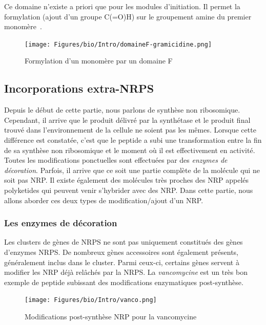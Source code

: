 Ce domaine n'existe a priori que pour les modules d'initiation.
Il permet la formylation (ajout d'un groupe C(=O)H) sur le groupement amine du premier monomère~\cite{schonafinger_amide_2007}.

\begin{figure}[h!]
  \begin{center}
    \texttt{[image: Figures/bio/Intro/domaineF-gramicidine.png]}
    \caption{\label{domaine_F}Formylation d'un monomère par un domaine F}
  \end{center}
\end{figure}


\subsection{Incorporations extra-NRPS}

Depuis le début de cette partie, nous parlons de synthèse non ribosomique.
Cependant, il arrive que le produit délivré par la synthétase et le produit final trouvé dans l'environnement de la cellule ne soient pas les mêmes.
Lorsque cette différence est constatée, c'est que le peptide a subi une transformation entre la fin de sa synthèse non ribosomique et le moment où il est effectivement en activité.
Toutes les modifications ponctuelles sont effectuées par des \textit{enzymes de décoration}.
Parfois, il arrive que ce soit une partie complète de la molécule qui ne soit pas NRP.
Il existe également des molécules très proches des NRP appelés polyketides qui peuvent venir s'hybrider avec des NRP.
Dans cette partie, nous allons aborder ces deux types de modification/ajout d'un NRP.


\subsubsection{Les enzymes de décoration}

\label{sucres}

Les clusters de gènes de NRPS ne sont pas uniquement constitués des gènes d'enzymes NRPS.
De nombreux gènes accessoires sont également présents, généralement inclus dans le cluster.
Parmi ceux-ci, certains gènes servent à modifier les NRP déjà relâchés par la NRPS.
La \textit{vancomycine} est un très bon exemple de peptide subissant des modifications enzymatiques post-synthèse.

\begin{figure}[h!]
  \begin{center}
    \texttt{[image: Figures/bio/Intro/vanco.png]}
    \caption{\label{vanco}Modifications post-synthèse NRP pour la vancomycine}
  \end{center}
\end{figure}

